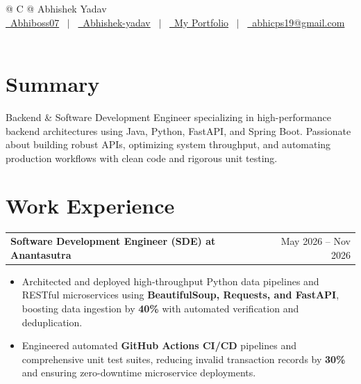 \documentclass[a4paper,10pt]{article}
\makeatletter
\newenvironment{joblong}[2]
    {
    \begin{tabularx}{\linewidth}{@{}l X r@{}}
    \textbf{#1} & \hfill &  #2 \\[3.50pt]
    \end{tabularx}
    \begin{minipage}[t]{\linewidth}
    \begin{itemize}[nosep,after=\strut, leftmargin=1em, itemsep=3pt,label=--]
    }
    {
    \end{itemize}
    \end{minipage}
    }
\makeatother
\begin{document}
\pagestyle{empty}

\begin{tabularx}{\linewidth}{@{} C @{}}
\Huge{Abhishek Yadav}\\[7.5pt]
\href{https://github.com/Abhiboss07}{\raisebox{-0.05\height}\faGithub\ Abhiboss07} \ $|$ \
\href{https://linkedin.com/in/abhishek-yadav-4738032b7/}{\raisebox{-0.05\height}\faLinkedin\ Abhishek-yadav} \ $|$ \
\href{https://portfolio-abhishek-01.vercel.app}{\raisebox{-0.05\height}\faGlobe \ My Portfolio} \ $|$ \
\href{mailto:abhicps19@gmail.com}{\raisebox{-0.05\height}\faEnvelope \ abhicps19@gmail.com} \ \ \\
\end{tabularx}

\section{Summary}
Backend & Software Development Engineer specializing in high-performance backend architectures using Java, Python, FastAPI, and Spring Boot. Passionate about building robust APIs, optimizing system throughput, and automating production workflows with clean code and rigorous unit testing.

\section{Work Experience}

\begin{joblong}{Software Development Engineer (SDE) at Anantasutra}{May 2026 -- Nov 2026}
\item Architected and deployed high-throughput Python data pipelines and RESTful microservices using \textbf{BeautifulSoup, Requests, and FastAPI}, boosting data ingestion by \textbf{40\%} with automated verification and deduplication.
\item Engineered automated \textbf{GitHub Actions CI/CD} pipelines and comprehensive unit test suites, reducing invalid transaction records by \textbf{30\%} and ensuring zero-downtime microservice deployments.
\end{joblong}
\end{document}
